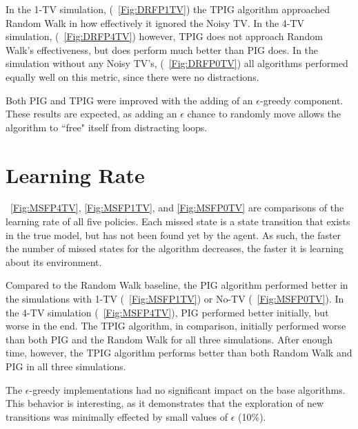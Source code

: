 \documentclass[12pt]{thesis}
\begin{document}
In the 1-TV simulation, (\figurename~\ref{Fig:DRFP1TV}) the TPIG algorithm approached Random Walk in how effectively it ignored the Noisy TV. In the 4-TV simulation, (\figurename~\ref{Fig:DRFP4TV}) however, TPIG does not approach Random Walk's effectiveness, but does perform much better than PIG does. In the simulation without any Noisy TV's, (\figurename~\ref{Fig:DRFP0TV}) all algorithms performed equally well on this metric, since there were no distractions.


Both PIG and TPIG were improved with the adding of an $\epsilon$-greedy component. These results are expected, as adding an $\epsilon$ chance to randomly move allows the algorithm to ``free" itself from distracting loops.



\section{Learning Rate}
\figurename~\ref{Fig:MSFP4TV}, \ref{Fig:MSFP1TV}, and \ref{Fig:MSFP0TV} are comparisons of the learning rate of all five policies. Each missed state is a state transition that exists in the true model, but has not been found yet by the agent. As such, the faster the number of missed states for the algorithm decreases, the faster it is learning about its environment.

Compared to the Random Walk baseline, the PIG algorithm performed better in the simulations with 1-TV (\figurename~\ref{Fig:MSFP1TV}) or No-TV (\figurename~\ref{Fig:MSFP0TV}). In the 4-TV simulation (\figurename~\ref{Fig:MSFP4TV}), PIG performed better initially, but worse in the end. The TPIG algorithm, in comparison, initially performed worse than both PIG and the Random Walk for all three simulations. After enough time, however, the TPIG algorithm performs better than both Random Walk and PIG in all three simulations.

The $\epsilon$-greedy implementations had no significant impact on the base algorithms. This behavior is interesting, as it demonstrates that the exploration of new transitions was minimally effected by small values of $\epsilon$ (10\%).
\end{document}
